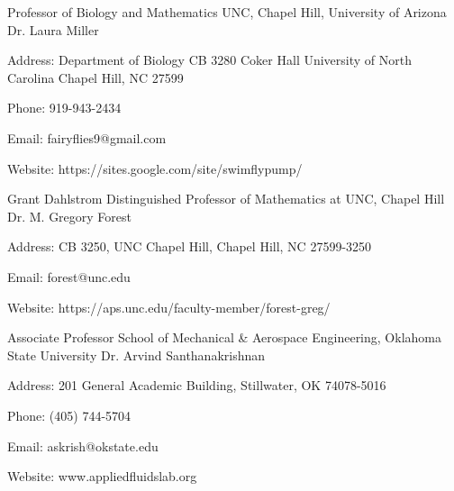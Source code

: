 
  \cventry
    {Professor of Biology and Mathematics UNC, Chapel Hill, University of Arizona} %
    {Dr. Laura Miller} %
    {} %
    {} %
    {
      \begin{cvitems} %
        \item {Address: Department of Biology CB 3280 Coker Hall University of North Carolina Chapel Hill, NC 27599}
        \item {Phone: 919-943-2434}
        \item {Email: fairyflies9@gmail.com }
        \item {Website: https://sites.google.com/site/swimflypump/}
      \end{cvitems}
    }

\cventry
    {Grant Dahlstrom Distinguished Professor of Mathematics at UNC, Chapel Hill} %
    {Dr. M. Gregory Forest} %
    {} %
    {} %
    {
      \begin{cvitems} %
        \item {Address: CB 3250, UNC Chapel Hill, Chapel Hill, NC 27599-3250}
        \item {Email: forest@unc.edu }
        \item {Website: https://aps.unc.edu/faculty-member/forest-greg/}
      \end{cvitems}
    }

\cventry
    {Associate Professor School of Mechanical \& Aerospace Engineering, Oklahoma State University} %
    {Dr. Arvind Santhanakrishnan} %
    {} %
    {} %
    {
      \begin{cvitems} %
        \item {Address: 201 General Academic Building, Stillwater, OK 74078-5016}
        \item {Phone: (405) 744-5704}
        \item {Email: askrish@okstate.edu}
        \item {Website: www.appliedfluidslab.org}
      \end{cvitems}
    }

